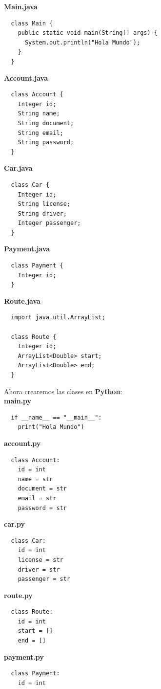 \documentclass{article}
\begin{document}
\textbf{Main.java}
\begin{verbatim}
  class Main {
    public static void main(String[] args) {
      System.out.println("Hola Mundo");
    }
  }
\end{verbatim}

\textbf{Account.java}
\begin{verbatim}
  class Account {
    Integer id;
    String name;
    String document;
    String email;
    String password;
  }
\end{verbatim}

\textbf{Car.java}
\begin{verbatim}
  class Car {
    Integer id;
    String license;
    String driver;
    Integer passenger;
  }
\end{verbatim}

\textbf{Payment.java}
\begin{verbatim}
  class Payment {
    Integer id;
  }
\end{verbatim}

\textbf{Route.java}
\begin{verbatim}
  import java.util.ArrayList;

  class Route {
    Integer id;
    ArrayList<Double> start;
    ArrayList<Double> end;
  }
\end{verbatim}

Ahora crearemos las clases en \textbf{Python}:\\

\textbf{main.py}
\begin{verbatim}
  if __name__ == "__main__":
    print("Hola Mundo")
\end{verbatim}

\textbf{account.py}
\begin{verbatim}
  class Account:
    id = int
    name = str
    document = str
    email = str
    password = str
\end{verbatim}

\textbf{car.py}
\begin{verbatim}
  class Car:
    id = int
    license = str
    driver = str
    passenger = str
\end{verbatim}

\textbf{route.py}
\begin{verbatim}
  class Route:
    id = int
    start = []
    end = []
\end{verbatim}

\textbf{payment.py}
\begin{verbatim}
  class Payment:
    id = int
\end{verbatim}
\end{document}
